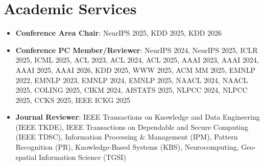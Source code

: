 \documentclass[letterpaper,11pt]{article}
\newcommand{\resumeSubHeadingListStart}{\begin{itemize}[leftmargin=*]}
\newcommand{\resumeSubHeadingListEnd}{\end{itemize}}
\begin{document}
%
\section{Academic Services}
\begin{itemize}[itemsep=0mm, topsep=2mm, leftmargin=*]
\item \textbf{Conference Area Chair}: NeurIPS 2025, KDD 2025, KDD 2026
\item \textbf{Conference PC Member/Reviewer}: NeurIPS 2024, NeurIPS 2025, ICLR 2025, ICML 2025, ACL 2023, ACL 2024, ACL 2025, AAAI 2023, AAAI 2024, AAAI 2025, AAAI 2026, KDD 2025, WWW 2025, ACM MM 2025, EMNLP 2022, EMNLP 2023, EMNLP 2024, EMNLP 2025, NAACL 2024, NAACL 2025, COLING 2025, CIKM 2024, AISTATS 2025, NLPCC 2024, NLPCC 2025, CCKS 2025, IEEE ICKG 2025
\item \textbf{Journal Reviewer}: IEEE Transactions on Knowledge and Data Engineering (IEEE TKDE), IEEE Transactions on Dependable and Secure Computing (IEEE TDSC), Information Processing \& Management (IPM), Pattern Recognition (PR), Knowledge-Based Systems (KBS), Neurocomputing, Geo-spatial Information Science (TGSI)
\end{itemize}



\end{document}
